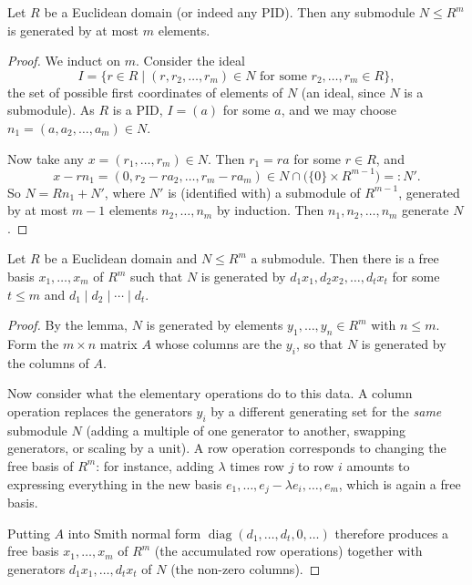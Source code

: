 \begin{lemma}
	Let $R$ be a Euclidean domain (or indeed any PID). Then any submodule $N \leq R^m$ is generated by at most $m$ elements.
\end{lemma}
\begin{proof}
	We induct on $m$. Consider the ideal
	$$
	I = \{r \in R \mid (r, r_2, \dots, r_m) \in N \text{ for some } r_2, \dots, r_m \in R\},
	$$
	the set of possible first coordinates of elements of $N$ (an ideal, since $N$ is a submodule). As $R$ is a PID, $I = (a)$ for some $a$, and we may choose $n_1 = (a, a_2, \dots, a_m) \in N$.

	Now take any $x = (r_1, \dots, r_m) \in N$. Then $r_1 = ra$ for some $r \in R$, and
	$$
	x - r n_1 = (0, r_2 - ra_2, \dots, r_m - ra_m) \in N \cap \big(\{0\} \times R^{m - 1}\big) =: N'.
	$$
	So $N = Rn_1 + N'$, where $N'$ is (identified with) a submodule of $R^{m-1}$, generated by at most $m - 1$ elements $n_2, \dots, n_m$ by induction. Then $n_1, n_2, \dots, n_m$ generate $N$.
\end{proof}

\begin{theorem}
	Let $R$ be a Euclidean domain and $N \leq R^m$ a submodule. Then there is a free basis $x_1, \dots, x_m$ of $R^m$ such that $N$ is generated by $d_1 x_1, d_2 x_2, \dots, d_t x_t$ for some $t \leq m$ and $d_1 \mid d_2 \mid \cdots \mid d_t$.
\end{theorem}
\begin{proof}
	By the lemma, $N$ is generated by elements $y_1, \dots, y_n \in R^m$ with $n \leq m$. Form the $m \times n$ matrix $A$ whose columns are the $y_i$, so that $N$ is generated by the columns of $A$.

	Now consider what the elementary operations do to this data. A column operation replaces the generators $y_i$ by a different generating set for the \emph{same} submodule $N$ (adding a multiple of one generator to another, swapping generators, or scaling by a unit). A row operation corresponds to changing the free basis of $R^m$: for instance, adding $\lambda$ times row $j$ to row $i$ amounts to expressing everything in the new basis $e_1, \dots, e_j - \lambda e_i, \dots, e_m$, which is again a free basis.

	Putting $A$ into Smith normal form $\operatorname{diag}(d_1, \dots, d_t, 0, \dots)$ therefore produces a free basis $x_1, \dots, x_m$ of $R^m$ (the accumulated row operations) together with generators $d_1 x_1, \dots, d_t x_t$ of $N$ (the non-zero columns).
\end{proof}

